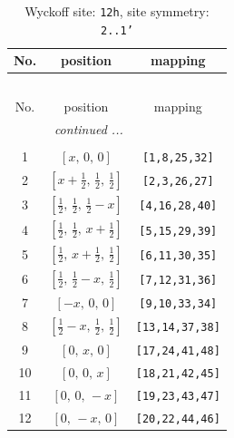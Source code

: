 \documentclass[fleqn,8pt]{jsarticle}
\begin{document}
\begin{longtable}{ccc}
\caption{Wyckoff site: {\tt 12h}, site symmetry: {\tt 2..1'}}
 \\
 \hline \hline
No. & position & mapping \\ \hline \endfirsthead

\multicolumn{2}{l}{\tablename\ \thetable{}} \\
 \hline \hline
No. & position & mapping \\ \hline \endhead

 \hline \hline
\multicolumn{2}{r}{\footnotesize\it continued ...} \\ \endfoot

 \hline \hline
\multicolumn{2}{r}{} \\ \endlastfoot

1 & $\left[ x,\, 0,\, 0 \right]$ & {\tt [1,8,25,32]} \\ \hline
2 & $\left[ x + \frac{1}{2},\, \frac{1}{2},\, \frac{1}{2} \right]$ & {\tt [2,3,26,27]} \\ \hline
3 & $\left[ \frac{1}{2},\, \frac{1}{2},\, \frac{1}{2} - x \right]$ & {\tt [4,16,28,40]} \\ \hline
4 & $\left[ \frac{1}{2},\, \frac{1}{2},\, x + \frac{1}{2} \right]$ & {\tt [5,15,29,39]} \\ \hline
5 & $\left[ \frac{1}{2},\, x + \frac{1}{2},\, \frac{1}{2} \right]$ & {\tt [6,11,30,35]} \\ \hline
6 & $\left[ \frac{1}{2},\, \frac{1}{2} - x,\, \frac{1}{2} \right]$ & {\tt [7,12,31,36]} \\ \hline
7 & $\left[ - x,\, 0,\, 0 \right]$ & {\tt [9,10,33,34]} \\ \hline
8 & $\left[ \frac{1}{2} - x,\, \frac{1}{2},\, \frac{1}{2} \right]$ & {\tt [13,14,37,38]} \\ \hline
9 & $\left[ 0,\, x,\, 0 \right]$ & {\tt [17,24,41,48]} \\ \hline
10 & $\left[ 0,\, 0,\, x \right]$ & {\tt [18,21,42,45]} \\ \hline
11 & $\left[ 0,\, 0,\, - x \right]$ & {\tt [19,23,43,47]} \\ \hline
12 & $\left[ 0,\, - x,\, 0 \right]$ & {\tt [20,22,44,46]} \\
\end{longtable}
\renewcommand{\arraystretch}{1.2}
\end{document}

